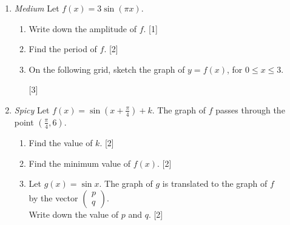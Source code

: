 \documentclass[12pt, twoside]{article}
\begin{document}
\begin{enumerate}
\newpage
\item \emph{Medium} Let $f(x)=3 \sin (\pi x)$.
  \begin{enumerate}
    \item Write down the amplitude of $f$. \hfill [1]
    \item Find the period of $f$. \hfill [2]
    \item On the following grid, sketch the graph of $y= f(x)$, for $0 \leq x \leq 3$.\\
        \hfill [3]
  \end{enumerate}

\item \emph{Spicy} Let $\displaystyle f(x)=\sin (x+\frac{\pi}{4})+k$. The graph of $f$ passes through the point $\displaystyle (\frac{\pi}{4}, 6)$.
\begin{enumerate}
  \item Find the value of $k$. \hfill [2]
  \item Find the minimum value of $f(x)$. \hfill [2]
  \item Let $g(x)=\sin x$. The graph of $g$ is translated to the graph of $f$\\ by the vector
    $\left( \begin{array}{c}
      p\\
      q
      \end{array} \right)$.
      \\
  Write down the value of $p$ and $q$.  \hfill [2]
  \end{enumerate}

\end{enumerate}
\end{document}
